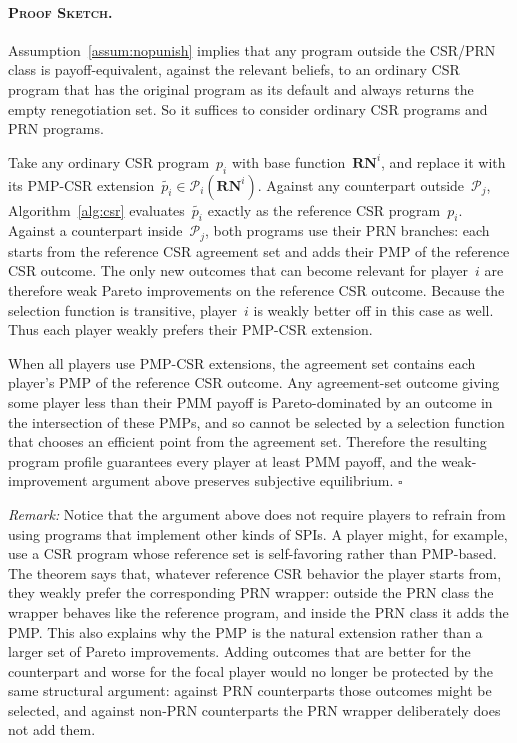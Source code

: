 \documentclass[sigconf]{aamas}
\newcommand{\prnspacei}{\mathcal{P}_i}
\newcommand{\prnspacej}{\mathcal{P}_j}
\theoremstyle{definition}
\newcommand{\renegi}{\reneg^{i}}
\newcommand{\selfunction}[0]{selection}%
\newcommand{\progi}{\prog_i}
\newcommand{\newprogi}{\widetilde{\progi}}
\newcommand{\reneg}{\mathbf{RN}}
\newcommand{\prog}{p}
\theoremstyle{definition}
\newenvironment{sketch}{\paragraph{\normalfont \textsc{Proof Sketch.}}}{\hfill$\square$ \\}
\begin{document}
\begin{sketch}
Assumption~\ref{assum:nopunish}
implies that any program outside the CSR/PRN class is payoff-equivalent,
against the relevant beliefs,
to an ordinary CSR program that has the original program as its default
and always returns the empty renegotiation set.
So it suffices to consider ordinary CSR programs and PRN programs.

Take any ordinary CSR program~$\progi$ with base function~$\renegi$,
and replace it with its PMP-CSR extension~$\newprogi \in \prnspacei(\renegi)$.
Against any counterpart outside~$\prnspacej$,
Algorithm~\ref{alg:csr} evaluates~$\newprogi$ exactly as the reference
CSR program~$\progi$.
Against a counterpart inside~$\prnspacej$,
both programs use their PRN branches: each starts from the reference CSR
agreement set and adds their PMP of the reference CSR outcome.
The only new outcomes that can become relevant for player~$i$ are therefore
weak Pareto improvements on the reference CSR outcome.
Because the \selfunction{} function is transitive,
player~$i$ is weakly better off in this case as well.
Thus each player weakly prefers their PMP-CSR extension.

When all players use PMP-CSR extensions,
the agreement set contains each player's PMP of the reference CSR outcome.
Any agreement-set outcome giving some player less than their PMM payoff is
Pareto-dominated by an outcome in the intersection of these PMPs, and so
cannot be selected by a \selfunction{} function that chooses an efficient
point from the agreement set.
Therefore the resulting program profile guarantees every player at least
PMM payoff, and the weak-improvement argument above preserves subjective
equilibrium.
\end{sketch}


\textit{Remark:} Notice that the argument above does not require players
to refrain from using programs that implement other kinds of SPIs.
A player might, for example, use a CSR program whose reference set is
self-favoring rather than PMP-based.
The theorem says that, whatever reference CSR behavior the player starts from,
they weakly prefer the corresponding PRN wrapper:
outside the PRN class the wrapper behaves like the reference program, and
inside the PRN class it adds the PMP.
This also explains why the PMP is the natural extension rather than a larger
set of Pareto improvements.
Adding outcomes that are better for the counterpart and worse for the focal
player would no longer be protected by the same structural argument: against
PRN counterparts those outcomes might be selected, and against non-PRN
counterparts the PRN wrapper deliberately does not add them.
\end{document}
